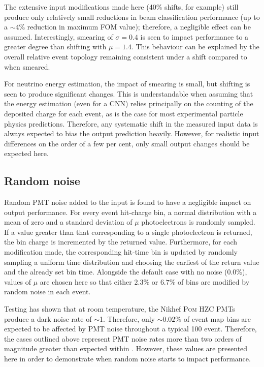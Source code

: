 The extensive input modifications made here (40\% shifts, for example) still produce only
relatively small reductions in beam classification performance (up to a $\sim4\%$ reduction in
maximum FOM value); therefore, a negligible effect can be assumed. Interestingly, smearing of
$\sigma=0.4$ is seen to impact performance to a greater degree than shifting with $\mu=1.4$. This
behaviour can be explained by the overall relative event topology remaining consistent under a
shift compared to when smeared.

For neutrino energy estimation, the impact of smearing is small, but shifting is seen to produce
significant changes. This is understandable when assuming that the energy estimation (even for a
CNN) relies principally on the counting of the deposited charge for each event, as is the case for
most experimental particle physics predictions. Therefore, any systematic shift in the measured
input data is always expected to bias the output prediction heavily. However, for realistic input
differences on the order of a few per cent, only small output changes should be expected here.

\subsection{Random noise} %
\label{sec:results_robust_noise} %

Random PMT noise added to the input is found to have a negligible impact on output performance.
For every event hit-charge bin, a normal distribution with a mean of zero and a standard deviation
of $\mu$ photoelectrons is randomly sampled. If a value greater than that corresponding to a
single photoelectron is returned, the bin charge is incremented by the returned value.
Furthermore, for each modification made, the corresponding hit-time bin is updated by randomly
sampling a uniform time distribution and choosing the earliest of the return value and the already
set bin time. Alongside the default case with no noise ($0.0\%$), values of $\mu$ are chosen here
so that either $2.3\%$ or $6.7\%$ of bins are modified by random noise in each event.

Testing has shown that at room temperature, the Nikhef \textsc{Pom} HZC PMTs produce a dark noise
rate of $\sim$\SI{1}{}. Therefore, only $\sim0.02\%$ of event map bins are expected to
be affected by PMT noise throughout a typical \SI{100}{} event. Therefore, the cases
outlined above represent PMT noise rates more than two orders of magnitude greater than expected
within \chipsfive. However, these values are presented here in order to demonstrate when random
noise starts to impact performance.

